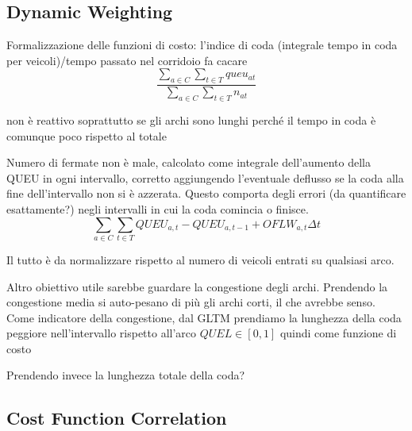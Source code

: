 \subsection{Dynamic Weighting}



Formalizzazione delle funzioni di costo:
l'indice di coda (integrale tempo in coda per veicoli)/tempo passato nel corridoio fa cacare
$$
\frac{\sum_{a \in C} \sum_{t \in T}{queu_{at}}}{\sum_{a \in C} \sum_{t \in T}{n_{at}}}
$$

non è reattivo soprattutto se gli archi sono lunghi perché il tempo in coda è comunque poco rispetto al totale


Numero di fermate non è male, calcolato come integrale dell'aumento della QUEU in ogni intervallo, corretto aggiungendo l'eventuale deflusso se la coda alla fine dell'intervallo non si è azzerata.
Questo comporta degli errori (da quantificare esattamente?) negli intervalli in cui la coda comincia o finisce.
$$
\sum_{a \in C} \sum_{t \in T} QUEU_{a,t} - QUEU_{a,t-1} + OFLW_{a,t} \Delta t
$$

Il tutto è da normalizzare rispetto al numero di veicoli entrati su qualsiasi arco.


Altro obiettivo utile sarebbe guardare la congestione degli archi.
Prendendo la congestione media si auto-pesano di più gli archi corti, il che avrebbe senso.
Come indicatore della congestione, dal GLTM prendiamo la lunghezza della coda peggiore nell'intervallo rispetto all'arco $QUEL\in[0,1]$ quindi come funzione di costo

Prendendo invece la lunghezza totale della coda?


\subsection{Cost Function Correlation}
